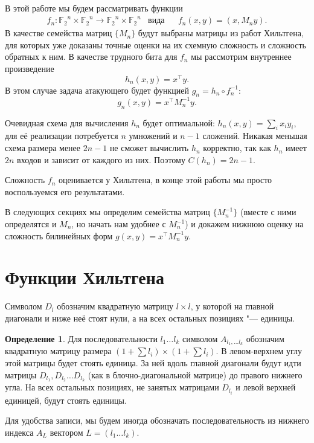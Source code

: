 \documentclass[oneside, a4paper]{article}
\theoremstyle{definition}
\newtheorem{definition}{Определение}
\theoremstyle{remark}
\newcommand\F{\ensuremath{{\mathbb F}_2}}
\begin{document}
В этой работе мы будем рассматривать функции
\[
\begin{aligned}
&f_n : \F^n \times \F^n \to \F^n \times \F^n
&
\text{вида}&
&
f_n(x, y) = (x, M_n y).&
\end{aligned}
\]
В качестве семейства матриц
$\{M_n\}$ будут выбраны матрицы из работ Хильтгена, для которых уже доказаны
точные оценки на их схемную сложность и сложность обратных к ним. В качестве
трудного бита для $f_n$ мы рассмотрим внутреннее произведение \[
h_n(x, y) = x^\top y.
\]
В этом случае задача атакующего будет функцией $g_n = h_n \circ f_n^{-1}$:
\[
g_n(x, y) = x^\top M_n^{-1} y.
\]

Очевидная схема для вычисления $h_n$ будет оптимальной: $h_n(x, y) = \sum_i x_i
y_i$, для её реализации потребуется $n$ умножений и $n - 1$ сложений. Никакая
меньшая схема размера менее $2n - 1$ не сможет вычислить $h_n$ корректно, так
как $h_n$ имеет $2n$ входов и зависит от каждого из них. Поэтому $C(h_n) = 2n - 1$.

Сложность $f_n$ оценивается у Хильтгена, в конце этой работы мы просто
воспользуемся его результатами.

В следующих секциях мы определим семейства матриц $\{M_n^{-1}\}$ (вместе с ними
определятся и $M_n$, но начать нам удобнее с $M_n^{-1}$) и докажем нижнюю оценку
на сложность билинейных форм $g(x, y) = x^\top M_n^{-1} y$.

\section{Функции Хильтгена}

Символом $D_l$ обозначим квадратную матрицу $l \times l$, у которой на главной
диагонали и ниже неё стоят нули, а на всех остальных позициях "--- единицы.

\begin{definition}
Для последовательности $l_1 \dots l_k$ символом $A_{l_1, \dots l_k}$ обозначим
квадратную матрицу размера $(1 + \sum l_i) \times (1 + \sum l_i)$. В левом-верхнем
углу этой матрицы будет стоять единица. За ней вдоль главной диагонали будут идти
матрицы $D_{l_1}, D_{l_2} \dots D_{l_k}$ (как в блочно-диагональной матрице) до
правого нижнего угла. На всех остальных позициях, не занятых матрицами $D_{l_i}$
и левой верхней единицей, будут стоять единицы.
\end{definition}

Для удобства записи, мы будем иногда обозначать последовательность из нижнего
индекса $A_L$ вектором $L = (l_1 \dots l_k)$.
\end{document}

